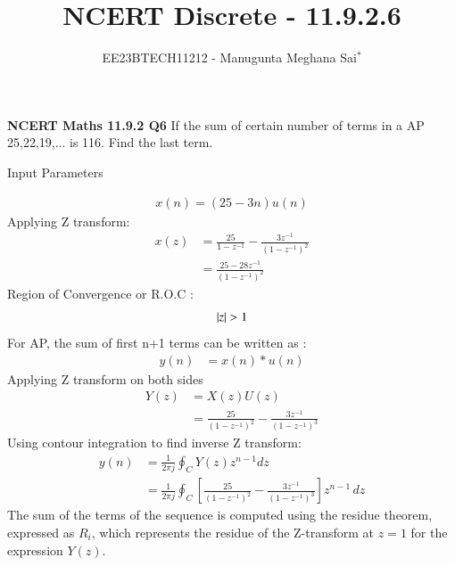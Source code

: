 \documentclass[journal,12pt,twocolumn]{IEEEtran}
\theoremstyle{remark}
\begin{document}

\vspace{3cm}

\title{NCERT Discrete - 11.9.2.6}
\author{EE23BTECH11212 - Manugunta Meghana Sai$^{*}$%
}
\maketitle
\newpage
\bigskip

\renewcommand{\thefigure}{\theenumi}
\renewcommand{\thetable}{\theenumi}

\vspace{3cm}
\textbf{NCERT Maths 11.9.2 Q6} 
If the sum of certain number of terms in a AP 25,22,19,... is 116. Find the last term.\\
\solution
\fi
\begin{table}[h!]
    \centering
    
    \caption{Input Parameters}
    \label{tab:table1}
\end{table}
\begin{align}
	x(n) = (25 - 3n)u(n)
	\label{eq:11.9.2.6}
\end{align}
Applying Z transform:
\begin{align}
    x(z) &=\frac{25}{1-z^{-1}} - \frac{3z^{-1}}{(1-z^{-1})^2}\\
    &= \frac{25-28z^{-1}}{(1-z^{-1})^2} 
\end{align}
     Region of Convergence or R.O.C :
\begin{align}
     \left\vert z\right\vert>1
\end{align}
For AP, the sum of first n+1 terms can be written as :
\begin{align}
	 y(n)&=x(n)*u(n)
\end{align}  
Applying Z transform on both sides
\begin{align}
	Y(z) &= X(z)U(z)\\
	&=\frac{25}{(1-z^{-1})^2} - \frac{3z^{-1}}{(1-z^{-1})^3}
\end{align}
Using contour integration to find inverse Z transform:
\begin{align}
	y(n) &= \frac{1}{2\pi j} \oint_C Y(z) z^{n-1} dz\\
	&= \frac{1}{2\pi j} \oint_C \left[ \frac{25}{(1-z^{-1})^2} - \frac{3z^{-1}}{(1-z^{-1})^3} \right]z^{n-1} \, dz
\end{align}
The sum of the terms of the sequence is computed using the residue theorem, expressed as $R_i$, which represents the residue of the Z-transform at $ z=1 $ for the expression $ Y(z) $.
\end{document}
